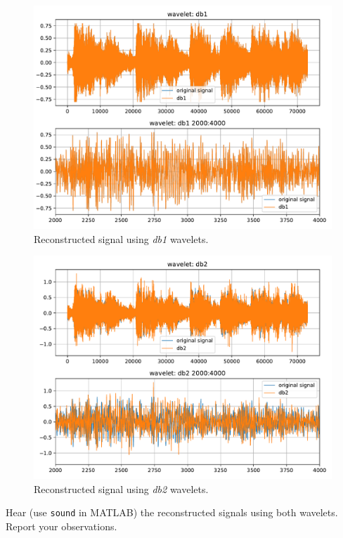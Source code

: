 \begin{figure}[H]
    \centering
    \includegraphics[width=\textwidth]{./img/problem1-2-reconstructed-signal-db1.pdf}
    \caption{Reconstructed signal using \textit{db1} wavelets.}
    \label{fig:y_reconstructed_with_db1}
\end{figure}

\begin{figure}[H]
    \centering
    \includegraphics[width=\textwidth]{./img/problem1-2-reconstructed-signal-db2.pdf}
    \caption{Reconstructed signal using \textit{db2} wavelets.}
    \label{fig:y_reconstructed_with_db2}
\end{figure}


\begin{tcolorbox}[colback=red!5!white,colframe=red!75!black,title=Problem 1.c]
    Hear (use \verb|sound| in MATLAB) the reconstructed signals using both wavelets.
    Report your observations.
\end{tcolorbox}

